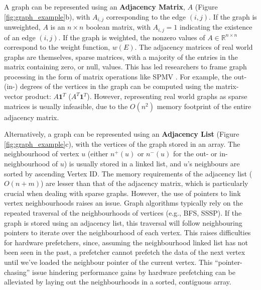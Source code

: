 A graph can be represented using an \textbf{Adjacency Matrix}, $A$ (Figure \ref{fig:graph_example}b), with $A_{i,j}$ corresponding to the edge $(i, j)$. If the graph is unweighted, $A$ is an $n\times n$ boolean matrix, with $A_{i,j} = 1$ indicating the existence of an edge $(i, j)$.
If the graph is weighted, the nonzero values of $A\in\mathbb{R}^{n\times n}$ correspond to the weight function, $w(E)$. The adjacency matrices of real world graphs are themselves, sparse matrices, with a majority of the entries in the matrix containing zero, or null, values. This has led researchers to frame graph processing in the form of matrix operations like \ac{SPMV} \cite{graphmat}. For example, the out- (in-) degrees of the vertices in the graph can be computed using the matrix-vector product: $A\mathbf{1}^T$ ($A^T\mathbf{1}^T$). However, representing real world graphs as sparse matrices is usually infeasible, due to the $O(n^2)$ memory footprint of the entire adjacency matrix.

Alternatively, a graph can be represented using an \textbf{Adjacency List} (Figure \ref{fig:graph_example}c), with the vertices of the graph stored in an array.
The neighbourhood of vertex $u$ (either $n^{+}(u)$ or $n^{-}(u)$ for the out- or in-neighbourhood of $u$) is usually stored in a linked list, and $u$'s neighbours are sorted by ascending Vertex ID. The memory requirements of the adjacency list ($O(n + m)$) are lesser than that of the adjacency matrix, which is particularly crucial when dealing with sparse graphs. However, the use of pointers to link vertex neighbourhoods raises an issue.
Graph algorithms typically rely on the repeated traversal of the neighbourhoods of vertices (e.g., \ac{BFS}, \ac{SSSP}). If the graph is stored using an adjacency list, this traversal will follow neighbouring pointers to iterate over the neighbourhood of each vertex. This raises difficulties for hardware prefetchers, since, assuming the neighbourhood linked list has not been seen in the past, a prefetcher cannot prefetch the data of the next vertex until we've loaded the neighbour pointer of the current vertex. This ``pointer-chasing'' issue hindering performance gains by hardware prefetching can be alleviated by laying out the neighbourhoods in a sorted, contiguous array.

